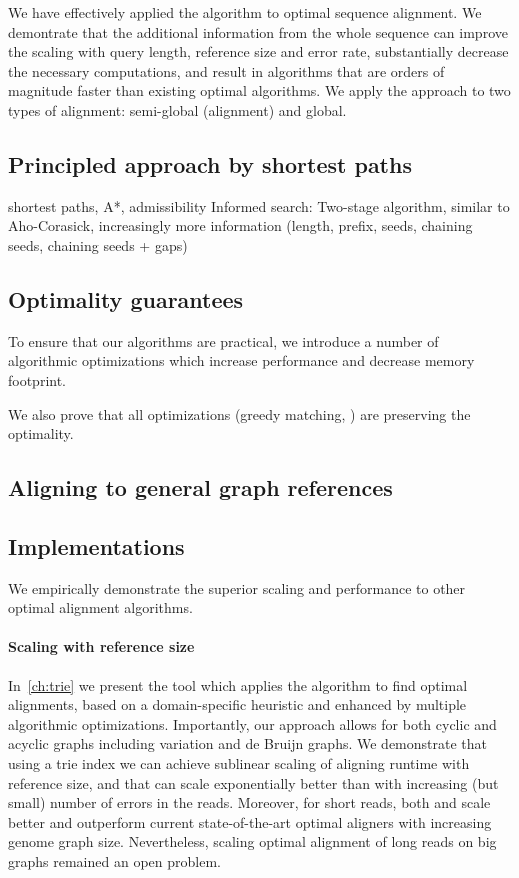 We have effectively applied the \A algorithm to optimal sequence alignment. We
demontrate that the additional information from the whole sequence can improve
the scaling with query length, reference size and error rate, substantially
decrease the necessary computations, and result in algorithms that are orders of
magnitude faster than existing optimal algorithms. We apply the \A approach to
two types of alignment: semi-global (alignment) and global.

\subsection*{Principled approach by shortest paths}
shortest paths,
A*, admissibility
Informed search: Two-stage algorithm, similar to Aho-Corasick, increasingly more information (length, prefix, seeds, chaining seeds, chaining seeds + gaps)



\subsection*{Optimality guarantees}
To ensure that our algorithms are practical, we introduce a number of
algorithmic optimizations which increase performance and decrease memory
footprint.

We also prove that all optimizations (greedy matching, ) are preserving the optimality.



\subsection*{Aligning to general graph references}

\subsection*{Implementations}

We empirically demonstrate the superior scaling and performance to other optimal
alignment algorithms.

\paragraph{Scaling with reference size}
In~\cref{ch:trie} we present the tool \astarix which applies the \A algorithm to
find optimal alignments, based on a domain-specific heuristic and enhanced by
multiple algorithmic optimizations. Importantly, our approach allows for both
cyclic and acyclic graphs including variation and de Bruijn graphs. We
demonstrate that using a trie index we can achieve sublinear scaling of aligning
runtime with reference size, and that \A can scale exponentially better than
\dijkstra with increasing (but small) number of errors in the reads. Moreover,
for short reads, both \astarix and \dijkstra scale better and outperform current
state-of-the-art optimal aligners with increasing genome graph size.
Nevertheless, scaling optimal alignment of long reads on big graphs remained an
open problem.

